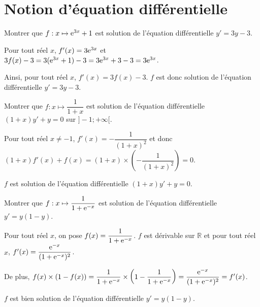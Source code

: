 \documentclass[11pt,fleqn, openany]{book} %
\begin{document}
\section*{Notion d'équation différentielle}

\begin{exercise}[topic=diff01]Montrer que $f:x \mapsto \mathrm{e}^{3x}+1$ est solution de l'équation différentielle $y'=3y-3$.\end{exercise}

\begin{solution}

Pour tout réel \(x\), \(f'(x)=3\mathrm{e}^{3x}\) et \(3f(x)-3=3(\mathrm{e}^{3x}+1)-3=3\mathrm{e}^{3x}+3-3=3\mathrm{e}^{3x}\).

Ainsi, pour tout réel \(x\), \(f'(x)=3f(x)-3\). \(f\) est donc solution de l'équation différentielle \(y'=3y-3\). \end{solution}



\begin{exercise}[topic=diff01]Montrer que $f:x\mapsto \dfrac{1}{1+x}$ est solution de l'équation différentielle $(1+x)y'+y=0$ sur $]-1;+\infty[$.\end{exercise}

\begin{solution}

Pour tout réel \(x\neq -1\), \(f'(x)=-\dfrac{1}{(1+x)^2}\) et donc $(1+x)f'(x)+f(x)=(1+x)\times \left(-\dfrac{1}{(1+x)^2}\right)=0$.

\(f\) est solution de l'équation différentielle \((1+x)y'+y=0\).

 \end{solution}
 
 

\begin{exercise}[topic=diff01]Montrer que $f:x \mapsto \dfrac{1}{1+\mathrm{e}^{-x}}$ est solution de l'équation différentielle $y'=y(1-y)$.\end{exercise}

\begin{solution}

Pour tout réel \(x\), on pose \(f(x)=\dfrac{1}{1+\mathrm{e}^{-x}}\). \(f\) est dérivable sur \(\mathbb{R}\) et pour tout réel \(x\), \(f'(x)=\dfrac{\mathrm{e}^{-x}}{(1+\mathrm{e}^{-x})^2}\). 

De plus, $f(x) \times (1-f(x)) = \dfrac{1}{1+\mathrm{e}^{-x}} \times \left(1-\dfrac{1}{1+\mathrm{e}^{-x}}\right)=\dfrac{\mathrm{e}^{-x}}{(1+\mathrm{e}^{-x})^2}=f'(x)$.

 \(f\) est bien solution de l'équation différentielle \(y'=y(1-y)\).
\end{solution}
\end{document}
